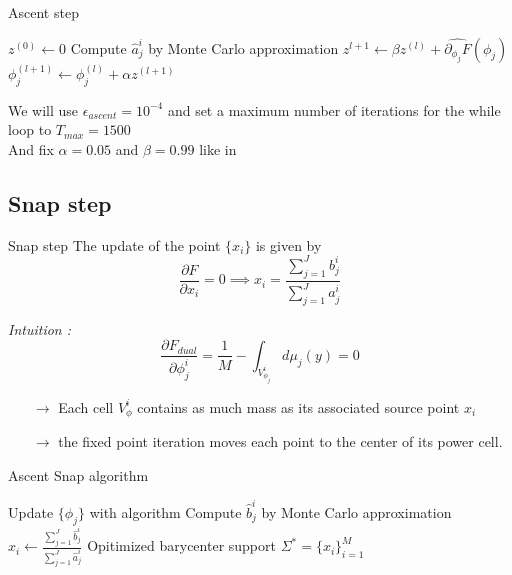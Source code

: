 \begin{frame}{Ascent step}
    \begin{algorithm}[H]
        \caption{Ascent step}
        \begin{algorithmic}[1]
            \STATE $z^{(0)} \gets 0$
            \STATE Compute $\hat{a}_j^i$ by Monte Carlo approximation
            \STATE $z^{l+1} \gets \beta z^{(l)} + \widehat{\partial_{\phi_j}F}(\phi_j)$ 
            \STATE $\phi_j^{(l+1)} \gets \phi_j^{(l)} + \alpha z^{(l+1)}$
            \ENDWHILE
            \ENDFOR
        \end{algorithmic}
    \end{algorithm}
    We will use $\epsilon_{ascent} = 10^{-4}$ and set a maximum number of iterations for the while loop to  $T_{max}=1500$ \\ 
    And fix $\alpha = 0.05$ and $\beta = 0.99$ like in \parencite{claici_stochastic_2018}
\end{frame}

\subsection{Snap step}
\begin{frame}{Snap step}
    The update of the point $\lbrace x_i \rbrace$ is given by 
$$
\frac{\partial F}{\partial x_i} = 0 \implies x_i = \frac{\sum_{j=1}^J b_j^i }{\sum_{j=1}^{J}a_j^i}
$$

\textit{Intuition :}  
$$
\frac{\partial F_{dual}}{\partial \phi_j^i} = \frac{1}{M} - \int_{V_{\phi_j}^i} d\mu_j(y) = 0
$$
\begin{itemize}
    \item[$\rightarrow$] Each cell $V_\phi^i$ contains as much mass as its associated source point $x_i$
    \item[$\rightarrow$] the fixed point iteration moves each point to the center of its power cell.
\end{itemize}
\end{frame}

\begin{frame}{Ascent Snap algorithm}

\begin{algorithm}[H]
    \caption{Ascent and Snap algorithm for computing Stochastic Wasserstein Barycenters}
    \begin{algorithmic}[1]
            \STATE Update $\lbrace \phi_j \rbrace$ with algorithm 
            \STATE Compute $\hat{b}_j^i$ by Monte Carlo approximation
                \STATE $x_i \gets \frac{\sum_{j=1}^J \hat{b}_j^i }{\sum_{j=1}^{J}\hat{a}_j^i}$ 
            \ENDFOR
        \ENDFOR
        \RETURN Opitimized barycenter support $\Sigma^* = \lbrace x_i \rbrace_{i=1}^M$
    \end{algorithmic}
\end{algorithm}

\end{frame}

